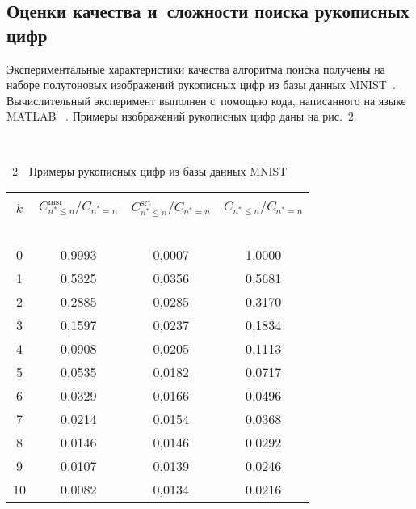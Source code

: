 \begin{multicols}{2}
  \section{Оценки качества и~сложности поиска рукописных цифр}
  
  Экспериментальные характеристики качества алгоритма поиска получены на 
наборе полутоновых изображений рукописных цифр из базы данных 
MNIST~\cite{12-lan}. Вычислительный эксперимент выполнен с~по\-мощью 
кода, написанного на языке MATLAB~\cite{15-lan} . Примеры изображений 
рукописных цифр даны на рис.~2. 

{ \begin{center}  %
 \vspace*{-3pt}
 \mbox{%
\epsfxsize=75mm
}


\end{center}

\vspace*{-6pt}


\noindent
{{\figurename~2}\ \ \small{Примеры рукописных цифр из базы данных MNIST}}

}

\vspace*{9pt}

\addtocounter{figure}{1}

  \begin{table*}\small
  \begin{center}
  \parbox{260pt}{

}

  \vspace*{2ex}
  
\tabcolsep=9pt
  \begin{tabular}{|c|c|c|c|}
  \hline
  &&&\\[-9pt]
$k$& $C^{\mathrm{msr}}_{n^*\leq  n}/C_{n^*=n}$ &
$C^{\mathrm{srt}}_{n^*\leq n}/C_{n^*=n}$ & $C_{n^*\leq  n}/C_{n^*=n}$\\
\ &\ &\ & \ \\[-9pt]
\hline
0& 0,9993& 0,0007& 1,0000\\
1& 0,5325& 0,0356& 0,5681\\
2& 0,2885& 0,0285& 0,3170\\
3& 0,1597& 0,0237& 0,1834\\
4&0,0908& 0,0205& 0,1113\\
5& 0,0535& 0,0182& 0,0717\\
6& 0,0329& 0,0166& 0,0496\\
7&0,0214& 0,0154& 0,0368\\
8& 0,0146& 0,0146& 0,0292\\
9& 0,0107& 0,0139& 0,0246\\
10\hphantom{9} & 0,0082& 0,0134& 0,0216\\
\hline
\end{tabular}
\end{center}
\vspace*{5pt}
\end{table*}
  

\end{multicols}
